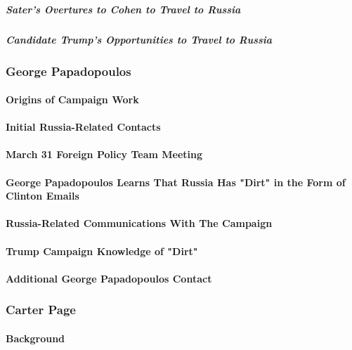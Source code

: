 \subparagraph{Sater's Overtures to Cohen to Travel to Russia}

\subparagraph{Candidate Trump's Opportunities to Travel to Russia}

\subsubsection{George Papadopoulos}

\paragraph{Origins of Campaign Work}

\paragraph{Initial Russia-Related Contacts}

\paragraph{March 31 Foreign Policy Team Meeting}

\paragraph{George Papadopoulos Learns That Russia Has "Dirt" in the Form of Clinton Emails}

\paragraph{Russia-Related Communications With The Campaign}

\paragraph{Trump Campaign Knowledge of "Dirt"}

\paragraph{Additional George Papadopoulos Contact}

\subsubsection{Carter Page}

\paragraph{Background}


